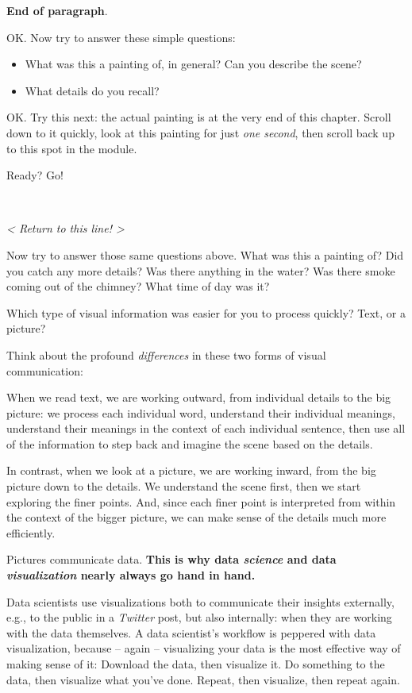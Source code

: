 \documentclass[
]{book}
\begin{document}
\textbf{End of paragraph}.

OK. Now try to answer these simple questions:

\begin{itemize}
\item
  What was this a painting of, in general? Can you describe the scene?
\item
  What details do you recall?
\end{itemize}

OK. Try this next: the actual painting is at the very end of this chapter. Scroll down to it quickly, look at this painting for just \emph{one second}, then scroll back up to this spot in the module.

Ready? Go!

~

\emph{\textless{} Return to this line! \textgreater{}}

Now try to answer those same questions above. What was this a painting of? Did you catch any more details? Was there anything in the water? Was there smoke coming out of the chimney? What time of day was it?

Which type of visual information was easier for you to process quickly? Text, or a picture?

Think about the profound \emph{differences} in these two forms of visual communication:

When we read text, we are working outward, from individual details to the big picture: we process each individual word, understand their individual meanings, understand their meanings in the context of each individual sentence, then use all of the information to step back and imagine the scene based on the details.

In contrast, when we look at a picture, we are working inward, from the big picture down to the details. We understand the scene first, then we start exploring the finer points. And, since each finer point is interpreted from within the context of the bigger picture, we can make sense of the details much more efficiently.

Pictures communicate data. \textbf{This is why data \emph{science} and data \emph{visualization} nearly always go hand in hand.}

Data scientists use visualizations both to communicate their insights externally, e.g., to the public in a \emph{Twitter} post, but also internally: when they are working with the data themselves. A data scientist's workflow is peppered with data visualization, because -- again -- visualizing your data is the most effective way of making sense of it: Download the data, then visualize it. Do something to the data, then visualize what you've done. Repeat, then visualize, then repeat again.
\end{document}
